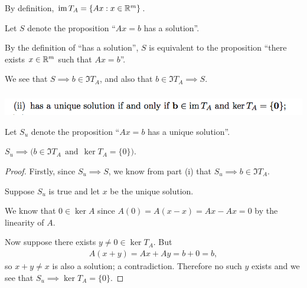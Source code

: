 \documentclass[12pt]{article}
\begin{document}
By definition,  $\operatorname{\text{im}} T_A = \{Ax: x \in \mathbb{R}^m\}$.

Let $S$ denote the proposition ``$Ax = b$ has a solution''.

By the definition of ``has a solution'', $S$ is equivalent to the proposition
``there exists $x \in \mathbb{R}^m$ such that $Ax = b$''.

We see that $S \implies b \in \Im T_A$, and also that $b \in \Im T_A \implies S$.







\subsubsection*{} %
\begin{mdframed}
\includegraphics[width=400pt]{img/oxford-prelims-2017-A-2-1-2.png}
\end{mdframed}

Let $S_u$ denote the proposition ``$Ax = b$ has a unique solution''.

\begin{claim*}
  $S_u \implies \Big(b \in \Im T_A ~~\text{and}~~ \ker T_A = \{0\}\Big)$.
\end{claim*}

\begin{proof}
Firstly, since $S_u \implies S$, we know from part (i) that
$S_u \implies b \in \Im T_A$.

Suppose $S_u$ is true and let $x$ be the unique solution.

We know that $0 \in \ker A$ since $A(0) = A(x - x) = Ax - Ax = 0$ by the
linearity of $A$.

Now suppose there exists $y \neq 0 \in \ker T_A$. But
\begin{align*}
A(x + y) = Ax + Ay = b + 0 = b,
\end{align*}
so $x + y \neq x$ is also a solution; a contradiction. Therefore no such $y$
exists and we see that $S_u \implies \ker T_A = \{0\}$.
\end{proof}
\end{document}
